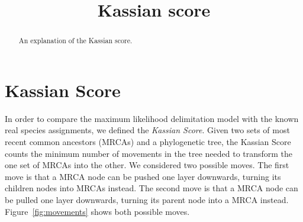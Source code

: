 \documentclass{llncs}
\begin{document}
\title{Kassian score}



\maketitle

\begin{abstract}
An explanation of the Kassian score.
\end{abstract}

\section{Kassian Score}
In order to compare the maximum likelihood delimitation model with the known real species assignments, we defined the \emph{Kassian Score}. Given two sets of most recent common ancestors (MRCAs) and a phylogenetic tree, the Kassian Score counts the minimum number of movements in the tree needed to transform the one set of MRCAs into the other. We considered two possible moves. The first move is that a MRCA node can be pushed one layer downwards, turning its children nodes into MRCAs instead. The second move is that a MRCA node can be pulled one layer downwards, turning its parent node into a MRCA instead. Figure~\ref{fig:movements} shows both possible moves.
\end{document}
